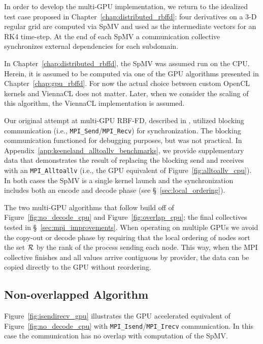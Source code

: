 In order to develop the multi-GPU implementation, we return to the idealized test case proposed in Chapter~\ref{chap:distributed_rbffd}: four derivatives on a 3-D regular grid are computed via SpMV and used as the intermediate vectors for an RK4 time-step. At the end of each SpMV a communication collective synchronizes external dependencies for each subdomain.

In Chapter~\ref{chap:distributed_rbffd}, the SpMV was assumed run on the CPU. Herein, it is assumed to be computed via one of the GPU algorithms presented in Chapter~\ref{chap:gpu_rbffd}. For now the actual choice between custom OpenCL kernels and ViennaCL does not matter. Later, when we consider the scaling of this algorithm, the ViennaCL implementation is assumed. 

Our original attempt at multi-GPU RBF-FD, described in \cite{BolligFlyerErlebacher2012}, utilized blocking communication (i.e., \texttt{MPI\_Send}/\texttt{MPI\_Recv}) for synchronization. The blocking communication functioned for debugging purposes, but was not practical. In Appendix~\ref{app:keeneland_alltoallv_benchmarks}, we provide supplementary data that demonstrates the result of replacing the blocking send and receives with an \texttt{MPI\_Alltoallv} (i.e., the GPU equivalent of Figure~\ref{fig:alltoallv_cpu}). In both cases the SpMV is a single kernel launch and the synchronization includes both an encode and decode phase (see \S~\ref{sec:local_ordering}). 

The two multi-GPU algorithms that follow build off of Figure~\ref{fig:no_decode_cpu} and Figure~\ref{fig:overlap_cpu}; the final collectives tested in \S~\ref{sec:mpi_improvements}. 
When operating on multiple GPUs we avoid the copy-out or decode phase by requiring that the local ordering of nodes sort the set $\mathcal{R}$ by the rank of the process sending each node. This way, when the MPI collective finishes and all values arrive contiguous by provider, the data can be copied directly to the GPU without reordering.

\subsection{Non-overlapped Algorithm}

Figure~\ref{fig:isendirecv_gpu} illustrates the GPU accelerated equivalent of Figure~\ref{fig:no_decode_cpu} with \texttt{MPI\_Isend}/\texttt{MPI\_Irecv} communication. In this case the communication has no overlap with computation of the SpMV. 

